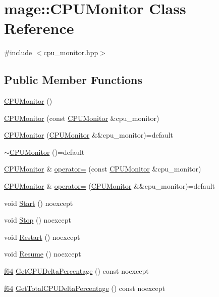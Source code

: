 \hypertarget{classmage_1_1_c_p_u_monitor}{}\section{mage\+:\+:C\+P\+U\+Monitor Class Reference}
\label{classmage_1_1_c_p_u_monitor}


{\ttfamily \#include $<$cpu\+\_\+monitor.\+hpp$>$}

\subsection*{Public Member Functions}
\begin{DoxyCompactItemize}
\item 
\hyperlink{classmage_1_1_c_p_u_monitor_a06f9aa6e78b6659617345784f874dec6}{C\+P\+U\+Monitor} ()
\item 
\hyperlink{classmage_1_1_c_p_u_monitor_a381bdfa95b34c591c6fbdb184e889f88}{C\+P\+U\+Monitor} (const \hyperlink{classmage_1_1_c_p_u_monitor}{C\+P\+U\+Monitor} \&cpu\+\_\+monitor)
\item 
\hyperlink{classmage_1_1_c_p_u_monitor_ae2002af06ed2928e41c97e401077ae16}{C\+P\+U\+Monitor} (\hyperlink{classmage_1_1_c_p_u_monitor}{C\+P\+U\+Monitor} \&\&cpu\+\_\+monitor)=default
\item 
\hyperlink{classmage_1_1_c_p_u_monitor_a597ea4b27675a22d3d66a1d817b26652}{$\sim$\+C\+P\+U\+Monitor} ()=default
\item 
\hyperlink{classmage_1_1_c_p_u_monitor}{C\+P\+U\+Monitor} \& \hyperlink{classmage_1_1_c_p_u_monitor_a6009df0994652d011a78d1f12013e599}{operator=} (const \hyperlink{classmage_1_1_c_p_u_monitor}{C\+P\+U\+Monitor} \&cpu\+\_\+monitor)
\item 
\hyperlink{classmage_1_1_c_p_u_monitor}{C\+P\+U\+Monitor} \& \hyperlink{classmage_1_1_c_p_u_monitor_ad931f354e4191429937cb2c3e44290f1}{operator=} (\hyperlink{classmage_1_1_c_p_u_monitor}{C\+P\+U\+Monitor} \&\&cpu\+\_\+monitor)=default
\item 
void \hyperlink{classmage_1_1_c_p_u_monitor_a3f88acbb979f47309fd46f1b507fed09}{Start} () noexcept
\item 
void \hyperlink{classmage_1_1_c_p_u_monitor_a133aaed1df0e84486a6fc748d66615bb}{Stop} () noexcept
\item 
void \hyperlink{classmage_1_1_c_p_u_monitor_ab8b04a64545df631be0f40a54cc49e03}{Restart} () noexcept
\item 
void \hyperlink{classmage_1_1_c_p_u_monitor_a5fd594262dc1073da564955c58851760}{Resume} () noexcept
\item 
\hyperlink{namespacemage_ab935747c6941320bd6214b5a5f265b09}{f64} \hyperlink{classmage_1_1_c_p_u_monitor_a689c2c84c767eddef687c6221424f81d}{Get\+C\+P\+U\+Delta\+Percentage} () const noexcept
\item 
\hyperlink{namespacemage_ab935747c6941320bd6214b5a5f265b09}{f64} \hyperlink{classmage_1_1_c_p_u_monitor_a2a53ab21b6b4263a57e34a1d1fcd1f68}{Get\+Total\+C\+P\+U\+Delta\+Percentage} () const noexcept
\end{DoxyCompactItemize}
